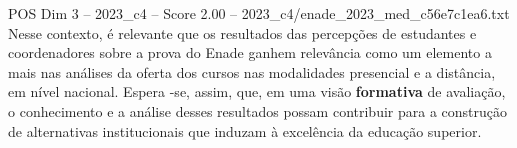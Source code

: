 \begin{textsample}{POS Dim 3 – 2023\_c4 – Score 2.00 – 2023\_c4/enade\_2023\_med\_c56e7c1ea6.txt}
Nesse contexto, é relevante que os resultados das percepções de estudantes e coordenadores sobre a prova do Enade ganhem relevância como um elemento a mais nas análises da oferta dos cursos nas modalidades presencial e a distância, em nível nacional.
Espera -se, assim, que, em uma visão \textbf{formativa} de avaliação, o conhecimento e a análise desses resultados possam contribuir para a construção de alternativas institucionais que induzam à excelência da educação superior.

\end{textsample}
